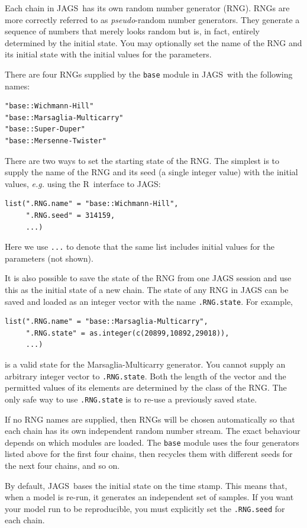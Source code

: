 \documentclass[11pt, a4paper, titlepage]{report}
\newcommand{\JAGS}{\textsf{JAGS}}
\newcommand{\R}{\textsf{R}}
\begin{document}
Each chain in \JAGS\ has its own random number generator (RNG). RNGs
are more correctly referred to as {\em pseudo}-random number
generators. They generate a sequence of numbers that merely looks
random but is, in fact, entirely determined by the initial state.  You
may optionally set the name of the RNG and its initial state with the
initial values for the parameters.

There are four RNGs supplied by the \texttt{base} module in \JAGS\
with the following names:
\begin{verbatim}
"base::Wichmann-Hill"
"base::Marsaglia-Multicarry"
"base::Super-Duper"
"base::Mersenne-Twister"
\end{verbatim}

There are two ways to set the starting state of the RNG. The simplest
is to supply the name of the RNG and its seed (a single integer value)
with the initial values, {\em e.g.} using the \R\ interface to \JAGS:
\begin{verbatim}
list(".RNG.name" = "base::Wichmann-Hill",
     ".RNG.seed" = 314159,
     ...)
\end{verbatim}
Here we use \texttt{...} to denote that the same list includes initial
values for the parameters (not shown).

It is also possible to save the state of the RNG from one JAGS session
and use this as the initial state of a new chain. The state of any RNG
in JAGS can be saved and loaded as an integer vector with the name
\texttt{.RNG.state}. For example,
\begin{verbatim}
list(".RNG.name" = "base::Marsaglia-Multicarry",
     ".RNG.state" = as.integer(c(20899,10892,29018)),
     ...)
\end{verbatim}
is a valid state for the Marsaglia-Multicarry generator.  You cannot
supply an arbitrary integer vector to \texttt{.RNG.state}. Both the
length of the vector and the permitted values of its elements are
determined by the class of the RNG. The only safe way to use
\texttt{.RNG.state} is to re-use a previously saved state.

If no RNG names are supplied, then RNGs will be chosen automatically
so that each chain has its own independent random number stream.  The
exact behaviour depends on which modules are loaded. The \texttt{base}
module uses the four generators listed above for the first four
chains, then recycles them with different seeds for the next four
chains, and so on.  

By default, \JAGS\ bases the initial state on the time stamp. This
means that, when a model is re-run, it generates an independent set of
samples. If you want your model run to be reproducible, you must
explicitly set the \texttt{.RNG.seed} for each chain.
\end{document}

